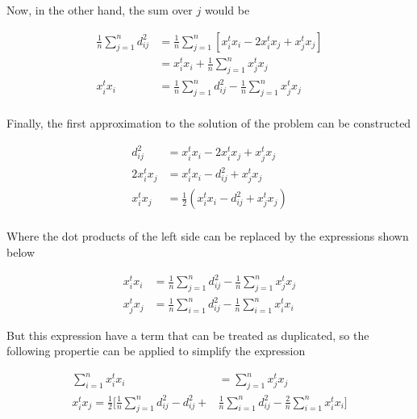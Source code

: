 \documentclass[12pt,journal]{IEEEtran}
\begin{document}
    Now, in the other hand, the sum over $j$ would be

    \begin{equation*}
        \begin{aligned}
            \frac{1}{n} \sum_{j=1}^n d_{ij}^2
            &=
            \frac{1}{n} \sum_{j=1}^n [x_i^t x_i - 2 x_i^t x_j + x_j^t x_j]\\
            &=
            x_i^t x_i + \frac{1}{n} \sum_{j=1}^n x_j^t x_j\\
            x_i^t x_i &= \frac{1}{n} \sum_{j=1}^n d_{ij}^2 - \frac{1}{n} \sum_{j=1}^n x_j^t x_j\\
        \end{aligned}
    \end{equation*}

    Finally, the first approximation to the solution of the problem can be
    constructed

    \begin{equation*}
        \begin{aligned}
            d_{ij}^2 &= x_i^t x_i - 2 x_i^t x_j + x_j^t x_j\\
            2 x_i^t x_j &= x_i^t x_i - d_{ij}^2 + x_j^t x_j\\
            x_i^t x_j &= \frac{1}{2} (x_i^t x_i - d_{ij}^2 + x_j^t x_j)\\
        \end{aligned}
    \end{equation*}

    Where the dot products of the left side can be replaced by the expressions
    shown below

    \begin{equation*}
        \begin{aligned}
            x_i^t x_i &= \frac{1}{n} \sum_{j=1}^n d_{ij}^2 - \frac{1}{n} \sum_{j=1}^n x_j^t x_j\\
            x_j^t x_j &= \frac{1}{n} \sum_{i=1}^n d_{ij}^2 - \frac{1}{n} \sum_{i=1}^n x_i^t x_i
        \end{aligned}
    \end{equation*}

    But this expression have a term that can be treated as duplicated, so the
    following propertie can be applied to simplify the expression

    \begin{equation*}
        \begin{aligned}
            \sum_{i=1}^n x_i^t x_i &= \sum_{j=1}^n x_j^t x_j\\
            x_i^t x_j =
            \frac{1}{2} \Bigg [ \frac{1}{n} \sum_{j=1}^n d_{ij}^2 - d_{ij}^2 + &\frac{1}{n} \sum_{i=1}^n d_{ij}^2 - \frac{2}{n} \sum_{i=1}^n x_i^t x_i \Bigg ]\\
        \end{aligned}
    \end{equation*}
\end{document}
